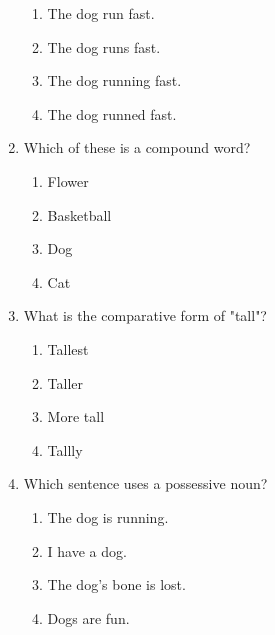 \documentclass[12pt]{article}
\begin{document}
\begin{enumerate}
    \begin{enumerate}[label=\Alph*.]
        \item The dog run fast.
        \item The dog runs fast.
        \item The dog running fast.
        \item The dog runned fast.
    \end{enumerate}

    \vspace{0.5cm}

    \item Which of these is a compound word?

    \begin{enumerate}[label=\Alph*.]
        \item Flower
        \item Basketball
        \item Dog
        \item Cat
    \end{enumerate}

    \vspace{0.5cm}

    \item What is the comparative form of "tall"?

    \begin{enumerate}[label=\Alph*.]
        \item Tallest
        \item Taller
        \item More tall
        \item Tallly
    \end{enumerate}

    \vspace{0.5cm}

    \item Which sentence uses a possessive noun?

    \begin{enumerate}[label=\Alph*.]
        \item The dog is running.
        \item I have a dog.
        \item The dog's bone is lost.
        \item Dogs are fun.
    \end{enumerate}

    \vspace{0.5cm}


\end{enumerate}
\end{document}
